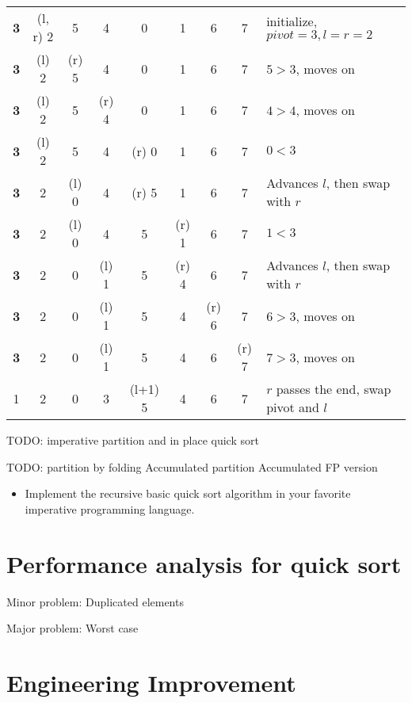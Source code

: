 \documentclass{article}
\begin{document}
\begin{tabular}{ | c c c c c c c c | l |}
\hline
{\bf 3} & (l, r) 2 & 5 & 4 & 0 & 1 & 6 & 7 & initialize, $pivot = 3, l=r=2$ \\
{\bf 3} & (l) 2 & (r) 5 & 4 & 0 & 1 & 6 & 7 & $5 > 3$, moves on \\
{\bf 3} & (l) 2 & 5 & (r) 4 & 0 & 1 & 6 & 7 & $4 > 4$, moves on \\
{\bf 3} & (l) 2 & 5 & 4 & (r) 0 & 1 & 6 & 7 & $0 < 3$ \\
{\bf 3} & 2 & (l) 0 & 4 & (r) 5 & 1 & 6 & 7 & Advances $l$, then swap with $r$ \\
{\bf 3} & 2 & (l) 0 & 4 & 5 & (r) 1 & 6 & 7 & $1 < 3$ \\
{\bf 3} & 2 & 0 & (l) 1 & 5 & (r) 4 & 6 & 7 & Advances $l$, then swap with $r$ \\
{\bf 3} & 2 & 0 & (l) 1 & 5 & 4 & (r) 6 & 7 & $6 > 3$, moves on \\
{\bf 3} & 2 & 0 & (l) 1 & 5 & 4 & 6 & (r) 7 & $7 > 3$, moves on \\
1 & 2 & 0 & 3 & (l+1) 5 & 4 & 6 & 7 & $r$ passes the end, swap pivot and $l$ \\
\hline
\end{tabular}


TODO: imperative partition and in place quick sort

TODO: 
partition by folding
Accumulated partition
Accumulated FP version

\begin{Exercise}
\begin{itemize}
\item Implement the recursive basic quick sort algorithm in your favorite imperative programming language.
\end{itemize}  
\end{Exercise}

\section{Performance analysis for quick sort}

Minor problem:
  Duplicated elements

Major problem:
  Worst case


\section{Engineering Improvement}
\end{document}
